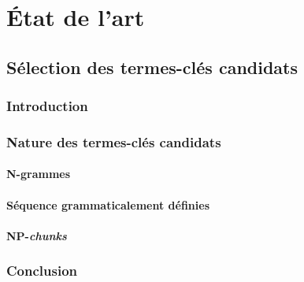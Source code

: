 \part{État de l'art}
\label{part:main-state_of_the_art}


  \chapter{Sélection des termes-clés candidats}
  \label{chap:main-state_of_the_art-keyphrase_candidate_selection}
    \section{Introduction}
    \label{sec:main-state_of_the_art-keyphrase_candidate_selection-introduction}

    \section{Nature des termes-clés candidats }
    \label{sec:main-state_of_the_art-keyphrase_candidate_selection-keyphrase_candidate_nature}
      \subsection{N-grammes}
      \label{subsec:main-state_of_the_art-automatic_keyphrase_extraction-automatic_keyphrase_extraction-n_grams}

      \subsection{Séquence grammaticalement définies}
      \label{subsec:main-state_of_the_art-automatic_keyphrase_extraction-automatic_keyphrase_extraction-pos_sequences}

      \subsection{NP-\textit{chunks}}
      \label{subsec:main-state_of_the_art-automatic_keyphrase_extraction-automatic_keyphrase_extraction-np_chunks}

    \section{Conclusion}
    \label{sec:main-state_of_the_art-keyphrase_candidate_selection-conclusion}

